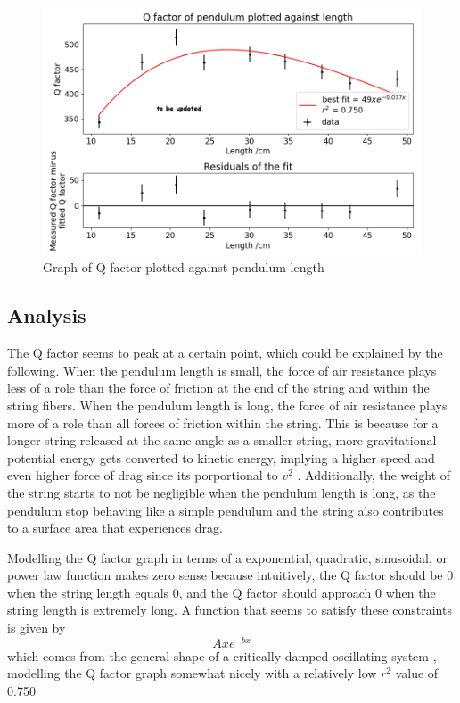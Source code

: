 \documentclass[11pt]{article}
\begin{document}
\begin{multicols}{2}
{\begin{figure}[H]
    \centering
    \includegraphics[width=\linewidth]{../figures/qfactor_vs_length.png}
    \caption{\centering Graph of Q factor plotted against pendulum length}
    \label{fig:figure 8}
\end{figure}

\subsection{Analysis}
The Q factor seems to peak at a certain point, which could be explained by the following. When the pendulum length is small, the force of air resistance plays less of a role than the force of friction at the end of the string and within the string fibers. When the pendulum length is long, the force of air resistance plays more of a role than all forces of friction within the string. This is because for a longer string released at the same angle as a smaller string, more gravitational potential energy gets converted to kinetic energy, implying a higher speed and even higher force of drag since its porportional to $v^2$ \cite{airdrag}. Additionally, the weight of the string starts to not be negligible when the pendulum length is long, as the pendulum stop behaving like a simple pendulum and the string also contributes to a surface area that experiences drag.

Modelling the Q factor graph in terms of a exponential, quadratic, sinusoidal, or power law function makes zero sense because intuitively, the Q factor should be 0 when the string length equals 0, and the Q factor should approach 0 when the string length is extremely long. A function that seems to satisfy these constraints is given by
\begin{equation} \label{eq:crit-damp}
    Axe^{-bx}
\end{equation}
which comes from the general shape of a critically damped oscillating system \cite{crit-damping}, modelling the Q factor graph somewhat nicely with a relatively low $r^2$ value of 0.750

}
\end{multicols}
\end{document}
